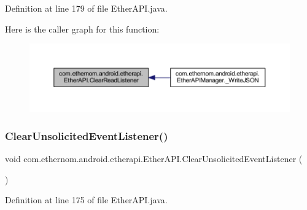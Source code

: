 Definition at line 179 of file Ether\+A\+P\+I.\+java.

Here is the caller graph for this function\+:\nopagebreak
\begin{figure}[H]
\begin{center}
\leavevmode
\includegraphics[width=350pt]{classcom_1_1ethernom_1_1android_1_1etherapi_1_1_ether_a_p_i_a8586a32236afdebca0f9730412d9e000_icgraph}
\end{center}
\end{figure}
\mbox{\label{classcom_1_1ethernom_1_1android_1_1etherapi_1_1_ether_a_p_i_a5333200b5c0642e16df1fa76148d158c}} 
\subsubsection{\texorpdfstring{Clear\+Unsolicited\+Event\+Listener()}{ClearUnsolicitedEventListener()}}
{\footnotesize\ttfamily void com.\+ethernom.\+android.\+etherapi.\+Ether\+A\+P\+I.\+Clear\+Unsolicited\+Event\+Listener (\begin{DoxyParamCaption}{ }\end{DoxyParamCaption})}



Definition at line 175 of file Ether\+A\+P\+I.\+java.

